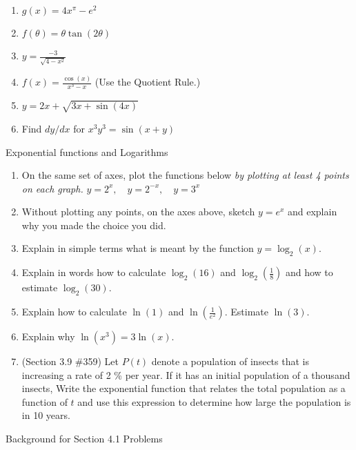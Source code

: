 \documentclass[11pt,fleqn]{article}
\begin{document}
 \begin{enumerate}
 \item \large{$g(x)=4x^{\pi}-e^2$}
 \vfill
 \item  \large{$f(\theta)=\theta \tan (2 \theta)$}
 \vfill
 \item  \large{$\displaystyle{y=\frac{-3}{\sqrt{4-x^2}}}$}
 \vfill
 \newpage
 \item \large{$f(x)=\frac{\cos(x)}{x^3 -x}$} (Use the Quotient Rule.)
 \vfill
 \item  \large{$y=2x+\sqrt{3x+\sin(4x)}$}
 \vfill
 \item Find $dy/dx$ for \large{$x^3 y^3=\sin(x+y)$ }
 \vfill
 \end{enumerate}
 \newpage
 \begin{center} Exponential functions and Logarithms \end{center}
 \begin{enumerate}
 \item On the same set of axes, plot the functions below \emph{by plotting at least 4 points on each graph.} $ y=2^x, \quad y=2^{-x}, \quad y=3^{x}$
 \vspace{2in}
 \item Without plotting any points, on the axes above, sketch $y=e^x$ and explain why you made the choice you did.
 \item Explain in simple terms what is meant by the function $y=\log_2 (x).$
 \vfill
 \item Explain in words how to calculate $\log_2(16)$ and $\log_2(\frac{1}{8})$ and how to estimate $\log_2(30).$
 \vfill
 \item Explain how to calculate $\ln (1)$ and $\ln (\frac{1}{e^2}).$ Estimate $\ln(3).$
 \vfill
 \item Explain why $\ln(x^3) = 3 \ln(x).$
 \vfill
 \item (Section 3.9 \#359) Let $P(t)$ denote a population of insects that is increasing a rate of 2 \% per year. If it has an initial population of a thousand insects, Write the exponential function that relates the total population as a function of $t$ and use this expression to determine how large the population is in 10 years.
 \vfill 
 
 \end{enumerate}
 \newpage
 \begin{center} Background for Section 4.1 Problems \end{center}
\end{document}
